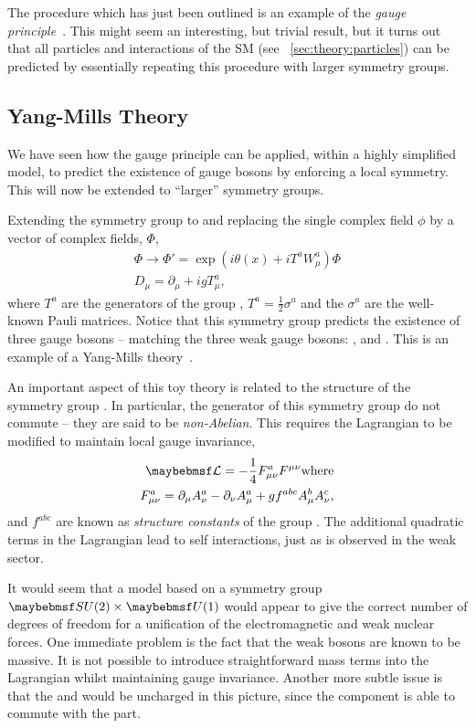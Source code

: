 The procedure which has just been outlined is an example of the \emph{gauge
  principle}~\cite{sm_intro}. This might seem an interesting, but trivial
result, but it turns out that all particles and interactions of the \ac{SM} (see
\sec~\ref{sec:theory:particles}) can be predicted by essentially repeating this
procedure with larger symmetry groups.

\subsection{Yang-Mills Theory}
We have seen how the gauge principle can be applied, within a highly simplified
model, to predict the existence of gauge bosons by enforcing a local
symmetry. This will now be extended to ``larger'' symmetry groups.

Extending the symmetry group to \SUtwo and replacing the single complex field
$\phi$ by a vector of complex fields, $\Phi$,
\begin{eqnarray*}
\Phi \longrightarrow \Phi' = \exp\left(i\theta(x) + iT^a W^a_{\mu}\right)\Phi\\
D_{\mu} = \partial_{\mu} + igT^a_{\mu},
\end{eqnarray*}
where $T^a$ are the generators of the group \SUtwo, $T^a = \frac{1}{2}\sigma^a$
and the $\sigma^a$ are the well-known Pauli matrices. Notice that this symmetry
group predicts the existence of three gauge bosons -- matching the three weak
gauge bosons: \PZ, \PWp and \PWm. This is an example of a Yang-Mills
theory~\cite{yangmills}.

An important aspect of this toy theory is related to the structure of the
symmetry group \SUtwo. In particular, the generator of this symmetry group do
not commute -- they are said to be \emph{non-Abelian}. This requires the Lagrangian
to be modified to maintain local gauge invariance,
\begin{eqnarray*}
\lagrangiand = -\frac{1}{4}F^a_{\mu\nu}F^{\mu\nu} \textrm{where}\\
F^a_{\mu\nu} = \partial_{\mu} A^a_{\nu} - \partial_{\nu} A^a_{\mu} + g f^{abc}
A^b_{\mu} A^c_{\nu},
\end{eqnarray*}
and $f^{abc}$ are known as \emph{structure constants} of the group \SUtwo. The
additional quadratic terms in the Lagrangian lead to self interactions, just as
is observed in the weak sector.

It would seem that a model based on a symmetry group $\SUtwo\times\Uone$ would
appear to give the correct number of degrees of freedom for a unification of the
electromagnetic and weak nuclear forces. One immediate problem is the fact that
the weak bosons are known to be massive. It is not possible to introduce
straightforward mass terms into the Lagrangian whilst maintaining gauge
invariance. Another more subtle issue is that the \PWp and \PWm would be
uncharged in this picture, since the \SUtwo component is able to commute with
the \Uone part.


